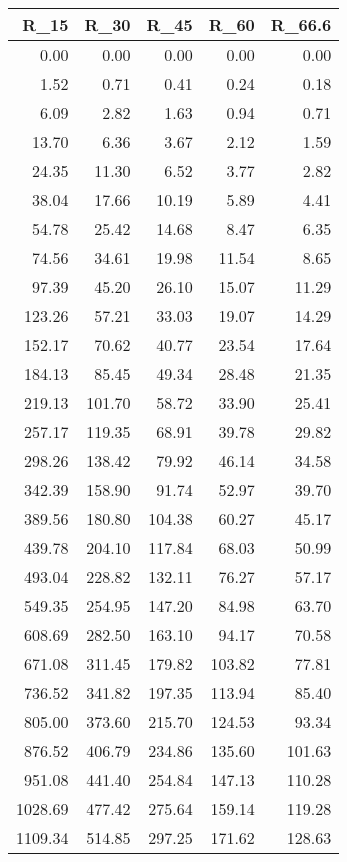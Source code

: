 \begin{tabular}{rrrrr}
\toprule
   R\_15 &   R\_30 &   R\_45 &   R\_60 &  R\_66.6 \\
\midrule
   0.00 &   0.00 &   0.00 &   0.00 &    0.00 \\
   1.52 &   0.71 &   0.41 &   0.24 &    0.18 \\
   6.09 &   2.82 &   1.63 &   0.94 &    0.71 \\
  13.70 &   6.36 &   3.67 &   2.12 &    1.59 \\
  24.35 &  11.30 &   6.52 &   3.77 &    2.82 \\
  38.04 &  17.66 &  10.19 &   5.89 &    4.41 \\
  54.78 &  25.42 &  14.68 &   8.47 &    6.35 \\
  74.56 &  34.61 &  19.98 &  11.54 &    8.65 \\
  97.39 &  45.20 &  26.10 &  15.07 &   11.29 \\
 123.26 &  57.21 &  33.03 &  19.07 &   14.29 \\
 152.17 &  70.62 &  40.77 &  23.54 &   17.64 \\
 184.13 &  85.45 &  49.34 &  28.48 &   21.35 \\
 219.13 & 101.70 &  58.72 &  33.90 &   25.41 \\
 257.17 & 119.35 &  68.91 &  39.78 &   29.82 \\
 298.26 & 138.42 &  79.92 &  46.14 &   34.58 \\
 342.39 & 158.90 &  91.74 &  52.97 &   39.70 \\
 389.56 & 180.80 & 104.38 &  60.27 &   45.17 \\
 439.78 & 204.10 & 117.84 &  68.03 &   50.99 \\
 493.04 & 228.82 & 132.11 &  76.27 &   57.17 \\
 549.35 & 254.95 & 147.20 &  84.98 &   63.70 \\
 608.69 & 282.50 & 163.10 &  94.17 &   70.58 \\
 671.08 & 311.45 & 179.82 & 103.82 &   77.81 \\
 736.52 & 341.82 & 197.35 & 113.94 &   85.40 \\
 805.00 & 373.60 & 215.70 & 124.53 &   93.34 \\
 876.52 & 406.79 & 234.86 & 135.60 &  101.63 \\
 951.08 & 441.40 & 254.84 & 147.13 &  110.28 \\
1028.69 & 477.42 & 275.64 & 159.14 &  119.28 \\
1109.34 & 514.85 & 297.25 & 171.62 &  128.63 \\

\end{tabular}
